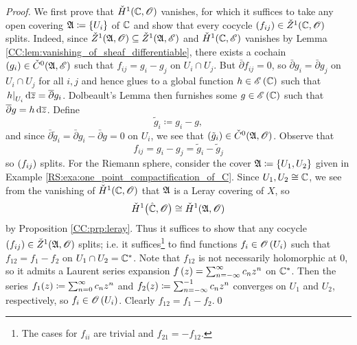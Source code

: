 \documentclass[../Moduli_Spaces_of_Riemann_Surfaces.tex]{subfiles}
\begin{document}
    \begin{proof}
        We first prove that $\check{H}^1\!\left(\mathbb{C},\mathscr{O}\right)$ vanishes, for which it suffices to take any open covering $\mathfrak{A}\coloneqq\left\{U_i\right\}$ of $\mathbb{C}$ and show that every cocycle $\left(f_{ij}\right)\in\check{Z}^1\!\left(\mathbb{C},\mathscr{O}\right)$ splits. Indeed, since $\check{Z}^1\!\left(\mathfrak{A},\mathscr{O}\right)\subseteq\check{Z}^1\!\left(\mathfrak{A},\mathscr{E}\right)$ and $\check{H}^1\!\left(\mathbb{C},\mathscr{E}\right)$ vanishes by Lemma \ref{CC:lem:vanishing_of_sheaf_differentiable}, there exists a cochain $\left(g_i\right)\in\check{C}^0\!\left(\mathfrak{A},\mathscr{E}\right)$ such that $f_{ij}=g_i-g_j$ on $U_i\cap U_j$. But $\bar{\partial}f_{ij}=0$, so $\bar{\partial}g_i=\bar{\partial}g_j$ on $U_i\cap U_j$ for all $i,j$ and hence glues to a global function $h\in\mathscr{E}\left(\mathbb{C}\right)$ such that $\left.h\right|_{U_i}\mathrm{d}\overline{z}=\overline{\partial}g_i$. Dolbeault's Lemma then furnishes some $g\in\mathscr{E}\left(\mathbb{C}\right)$ such that $\overline{\partial}g=h\,\mathrm{d}\overline{z}$. Define
        \begin{equation*}
            \tilde{g}_i\coloneqq g_i-g,
        \end{equation*}
        and since $\bar{\partial}\tilde{g}_i=\bar{\partial} g_i-\bar{\partial}g=0$ on $U_i$, we see that $\left(\tilde{g}_i\right)\in\check{C}^0\!\left(\mathfrak{A},\mathscr{O}\right)$. Observe that
        \begin{equation*}
            f_{ij}=g_i-g_j=\tilde{g}_i-\tilde{g}_j
        \end{equation*}
        so $\left(f_{ij}\right)$ splits. For the Riemann sphere, consider the cover $\mathfrak{A}\coloneqq\left\{U_1,U_2\right\}$ given in Example \ref{RS:exa:one_point_compactification_of_C}. Since $U_1,U_2\cong\mathbb{C}$, we see from the vanishing of $\check{H}^1\!\left(\mathbb{C},\mathscr{O}\right)$ that $\mathfrak{A}$ is a Leray covering of $X$, so
        \begin{equation*}
            \check{H}^1\big(\hat{\mathbb{C}},\mathscr{O}\big)\cong\check{H}^1\!\left(\mathfrak{A},\mathscr{O}\right)
        \end{equation*}
        by Proposition \ref{CC:prp:leray}. Thus it suffices to show that any cocycle $\left(f_{ij}\right)\in\check{Z}^1\!\left(\mathfrak{A},\mathscr{O}\right)$ splits; i.e. it suffices\footnote{The cases for $f_{ii}$ are trivial and $f_{21}=-f_{12}$.} to find functions $f_i\in\mathscr{O}\left(U_i\right)$ such that $f_{12}=f_1-f_2$ on $U_1\cap U_2=\mathbb{C}^\ast$. Note that $f_{12}$ is not necessarily holomorphic at $0$, so it admits a Laurent series expansion $f\left(z\right)=\sum_{n=-\infty}^{\infty}c_nz^n$ on $\mathbb{C}^\ast$. Then the series $f_1\!\left(z\right)\coloneqq\sum_{n=0}^{\infty}c_nz^n$ and $f_2\!\left(z\right)\coloneqq\sum_{n=-\infty}^{-1}c_nz^n$ converges on $U_1$ and $U_2$, respectively, so $f_i\in\mathscr{O}\left(U_i\right)$. Clearly $f_{12}=f_1-f_2$.\qed
    \end{proof}
\end{document}
